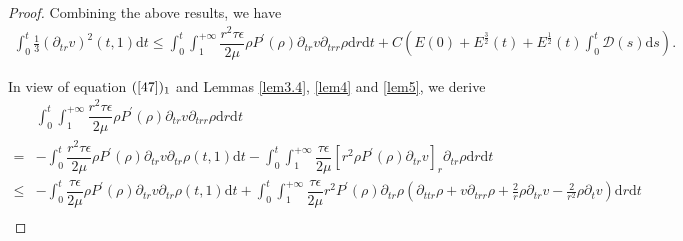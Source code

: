 \documentclass[10pt,reqno]{amsart}
\numberwithin{equation}{section}
\begin{document}
\begin{proof}
		Combining the above results, we have
		\begin{equation}\nonumber
			\begin{aligned}
				\int_{0}^{t}\frac{1}{3}(\partial_{tr} v)^2(t,1)\mathrm{d}t
				\leq
				\int_{0}^{t}\int_{1}^{+\infty}\dfrac{r^2\tau\epsilon}{2\mu}\rho P^{\prime}(\rho)\partial_{tr}v\partial_{trr}\rho \mathrm{d}r\mathrm{d}t
				+C\left(E(0)+ E^{\frac{3}{2}}(t)+ E^{\frac{1}{2}}(t) \int_{0}^{t}\mathcal{D}(s)\mathrm{d}s\right).
			\end{aligned}
		\end{equation}
		
		In view of equation $(\ref{47})_1$ and Lemmas \ref{lem3.4}, \ref{lem4} and \ref{lem5}, we derive
		\begin{equation}\nonumber
			\begin{aligned}
				&\int_{0}^{t}\int_{1}^{+\infty}\dfrac{r^2\tau\epsilon}{2\mu}\rho P^{\prime}(\rho)\partial_{tr}v\partial_{trr}\rho \mathrm{d}r\mathrm{d}t\\
				=&-\int_{0}^{t}\dfrac{r^2\tau\epsilon}{2\mu}\rho P^{\prime}(\rho)\partial_{tr}v\partial_{tr}\rho(t,1)\mathrm{d}t-
				\int_{0}^{t}\int_{1}^{+\infty}\dfrac{\tau\epsilon}{2\mu}[r^2\rho P^{\prime}(\rho)\partial_{tr}v]_r\partial_{tr}\rho \mathrm{d}r\mathrm{d}t\\
				\leq&-\int_{0}^{t}\dfrac{\tau\epsilon}{2\mu}\rho P^{\prime}(\rho)\partial_{tr}v\partial_{tr}\rho(t,1)\mathrm{d}t
				+\int_{0}^{t}\int_{1}^{+\infty}\dfrac{\tau\epsilon}{2\mu}r^2P^{\prime}(\rho)\partial_{tr}\rho(\partial_{ttr} \rho+v\partial_{trr}\rho+\frac{2}{r}\rho\partial_{tr}v-\frac{2}{r^2}\rho \partial_{t}v)\mathrm{d}r\mathrm{d}t\\

\end{aligned}
\end{equation}
\end{proof}
\end{document}
